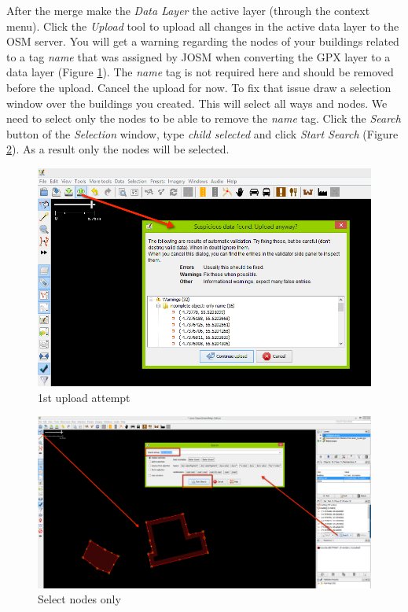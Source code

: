 \documentclass[a4paper,12pt,titlepage]{article}
\begin{document}
After the merge make the \textit{Data Layer} the active layer (through the context menu). Click the \textit{Upload} tool to upload all changes in the active data layer to the OSM server. You will get a warning regarding the nodes of your buildings related to a tag \textit{name} that was assigned by JOSM when converting the GPX layer to a data layer (Figure \ref{fig:node_error}). The \textit{name} tag is not required here and should be removed before the upload. Cancel the upload for now. To fix that issue draw a selection window over the buildings you created. This will select all ways and nodes. We need to select only the nodes to be able to remove the \textit{name} tag. Click the \textit{Search} button of the \textit{Selection} window, type \textit{child selected} and click \textit{Start Search} (Figure \ref{fig:find_nodes}). As a result only the nodes will be selected.

\begin{figure}[H]
	\centering
	\includegraphics[width=12cm]{Images/node_error.png}
	\caption{1st upload attempt}\label{fig:node_error}
\end{figure}

\begin{figure}[H]
	\centering
	\includegraphics[width=12cm]{Images/find_nodes.png}
	\caption{Select nodes only}\label{fig:find_nodes}
\end{figure}
\end{document}
